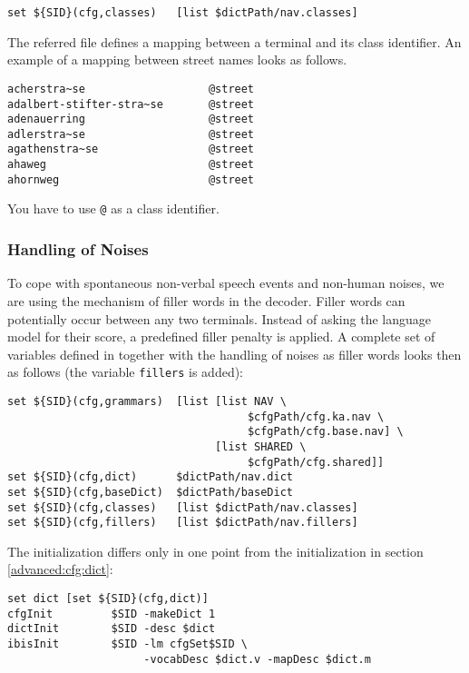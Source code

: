 \begin{verbatim}
set ${SID}(cfg,classes)   [list $dictPath/nav.classes]
\end{verbatim}

The referred file defines a mapping between a terminal and its class
identifier. An example of a mapping between street names looks as
follows.

\begin{verbatim}
acherstra~se                   @street
adalbert-stifter-stra~se       @street
adenauerring                   @street
adlerstra~se                   @street
agathenstra~se                 @street
ahaweg                         @street
ahornweg                       @street
\end{verbatim}

You have to use \texttt{@} as a class identifier.


\subsubsection{Handling of Noises}

To cope with spontaneous non-verbal speech events and non-human
noises, we are using the mechanism of filler words in the decoder.
Filler words can potentially occur between any two terminals. Instead
of asking the language model for their score, a predefined filler
penalty is applied. A complete set of variables defined in
 together with the handling of noises as filler
words looks then as follows (the variable \texttt{fillers} is added):

\begin{verbatim}
set ${SID}(cfg,grammars)  [list [list NAV \
                                     $cfgPath/cfg.ka.nav \
                                     $cfgPath/cfg.base.nav] \
                                [list SHARED \
                                     $cfgPath/cfg.shared]]
set ${SID}(cfg,dict)      $dictPath/nav.dict
set ${SID}(cfg,baseDict)  $dictPath/baseDict
set ${SID}(cfg,classes)   [list $dictPath/nav.classes]
set ${SID}(cfg,fillers)   [list $dictPath/nav.fillers]
\end{verbatim}

The initialization differs only in one point from the initialization
in section \ref{advanced:cfg:dict}:

\begin{verbatim}
set dict [set ${SID}(cfg,dict)]
cfgInit         $SID -makeDict 1
dictInit        $SID -desc $dict
ibisInit        $SID -lm cfgSet$SID \
                     -vocabDesc $dict.v -mapDesc $dict.m
\end{verbatim}

